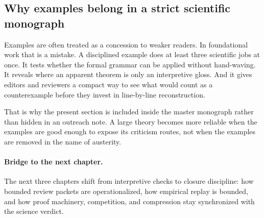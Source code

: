 \subsection{Why examples belong in a strict scientific monograph}

Examples are often treated as a concession to weaker readers. In foundational work that is a
mistake. A disciplined example does at least three scientific jobs at once. It tests whether the
formal grammar can be applied without hand-waving. It reveals where an apparent theorem is only an
interpretive gloss. And it gives editors and reviewers a compact way to see what would count as a
counterexample before they invest in line-by-line reconstruction.

That is why the present section is included inside the master monograph rather than hidden in an
outreach note. A large theory becomes more reliable when the examples are good enough to expose
its criticism routes, not when the examples are removed in the name of austerity.

\paragraph{Bridge to the next chapter.}
The next three chapters shift from interpretive checks to closure discipline:
how bounded review packets are operationalized, how empirical replay is bounded, and
how proof machinery, competition, and compression stay synchronized with the
science verdict.

\clearpage
